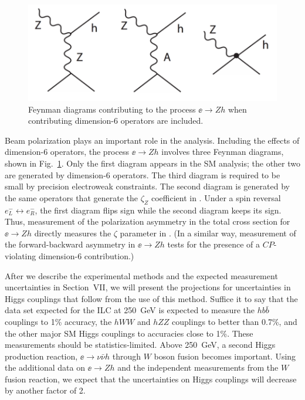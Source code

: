 \begin{figure}
\begin{center}
\includegraphics[width=0.80\hsize]{chapters/figures/Zhdiagrams.pdf}
\end{center}
\caption{Feynman diagrams contributing to the process $\ee\to Zh$ when contributing  dimension-6 operators are included. }
\label{fig:eeZhdiagrams}
\end{figure}


Beam polarization plays an important role in the analysis.   Including the effects of dimension-6 operators, the process $\ee\to Zh$  involves three Feynman diagrams, shown in Fig.~\ref{fig:eeZhdiagrams}.   Only the first diagram appears in the SM analysis; the other two are generated by dimension-6 operators.   The third diagram is required to be small by precision electroweak constraints.  The second diagram is generated by the same operators that generate the $\zeta_Z$ coefficient in .   Under a spin reversal $e^-_L \leftrightarrow e^-_R$, the first diagram flips sign while the second diagram keeps its sign.  Thus,  measurement of the 
polarization asymmetry  in the total cross section for $\ee\to Zh$ directly measures the $\zeta$ parameter in .   (In a similar way, measurement of the forward-backward asymmetry in $\ee\to Zh$ tests for the presence of a $CP$-violating dimension-6 contribution.)

After we describe the experimental methods and the expected measurement uncertainties in Section~VII, we will present the projections for uncertainties in 
Higgs couplings that follow from the use of this method.  Suffice it to say that the data set expected for the ILC at 250~GeV is expected to measure the $hb\bar b$ couplings to 1\% accuracy, the $hWW$ and $hZZ$ couplings to better than 0.7\%, and the other 
major SM Higgs couplings to accuracies close to 1\%.    These measurements should be 
statistics-limited.  Above 250~GeV, a second Higgs production reaction, $\ee\to \nu\bar\nu h$ through $W$ boson fusion becomes important.  Using the additional data on $\ee\to Zh$ and the independent measurements from the $W$ fusion reaction, we expect that the uncertainties on Higgs couplings will decrease by another factor of 2. 


